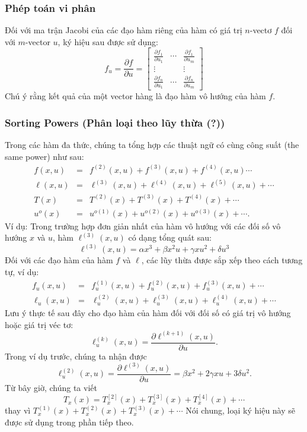 \documentclass[12pt,a4paper]{report}
\begin{document}
\subsubsection{Phép toán vi phân} Đối với ma trận Jacobi của các đạo hàm riêng của hàm có giá trị $n$-vectơ $f$ đối với $m$-vector $u$, ký hiệu sau được sử dụng: $$f_u = \frac{\partial f}{\partial u} = \begin{bmatrix}
\frac{\partial f_1}{\partial u_1} & \cdots & \frac{\partial f_1}{\partial u_m}\\ \vdots && \vdots \\ \frac{\partial f_n}{\partial u_1} &\cdots& \frac{\partial f_n}{\partial u_m}
\end{bmatrix}$$
Chú ý rằng kết quả của một vector hàng là đạo hàm vô hướng của hàm $f$.
\subsubsection{Sorting Powers (Phân loại theo lũy thừa (?))} Trong các hàm đa thức, chúng ta tổng hợp các thuật ngữ có cùng công suất (the same power) như sau: \begin{eqnarray}
	f(x, u) &=& f^{(2)}(x, u) + f^{(3)}(x, u) + f^{(4)}(x, u)\cdots \nonumber \\
	\ell(x, u) &=& \ell^{(3)}(x, u) + \ell^{(4)}(x, u) + \ell^{(5)}(x, u) + \cdots \nonumber \\
	T(x) &=& T^{(2)}(x) + T^{(3)}(x) + T^{(4)}(x) + \cdots \nonumber \\ u^o(x) &=& u^{o(1)}(x) + u^{o(2)}(x) + u^{o(3)}(x) + \cdots \nonumber .
\end{eqnarray}
Ví dụ: Trong trường hợp đơn giản nhất của hàm vô hướng với các đối số vô hướng $x$ và $u$, hàm $\ell^{(3)}(x, u)$ có dạng tổng quát sau: $$\ell^{(3)}(x, u) = \alpha x^3 + \beta x^2u + \gamma xu^2 + \delta u^3$$
Đối với các đạo hàm của hàm $f$ và $\ell$, các lũy thừa được sắp xếp theo cách tương tự, ví dụ: \begin{eqnarray}
	f_u(x, u) &=& f_u^{(1)}(x, u) + f_u^{(2)}(x, u) + f_u^{(3)}(x, u) + \cdots \nonumber \\ \ell_u(x, u) &=& \ell_u^{(2)}(x, u) + \ell_u^{(3)}(x, u) + \ell_u^{(4)}(x, u) + \cdots \nonumber
\end{eqnarray}
Lưu ý thực tế sau đây cho đạo hàm của hàm đối với đối số có giá trị vô hướng hoặc giá trị véc tơ: $$\ell_u^{(k)}(x, u) = \frac{\partial\ell^{(k+1)}(x, u)}{\partial u}.$$
Trong ví dụ trước, chúng ta nhận được
$$\ell_u^{(2)}(x, u) = \frac{\partial\ell^{(3)}(x, u)}{\partial u} = \beta x^2 + 2\gamma xu + 3\delta u^2.$$ Từ bây giờ, chúng ta viết $$T_x(x) = T_x^{[2]}(x) + T_x^{[3]}(x) + T_x^{[4]}(x) + \cdots$$ thay vì $T_x^{(1)}(x) + T_x^{(2)}(x) + T_x^{(3)}(x) + \cdots$
Nói chung, loại ký hiệu này sẽ được sử dụng trong phần tiếp theo. 
\end{document}
